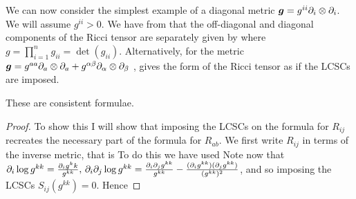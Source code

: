 \documentclass{article}
\begin{document}
We can now consider the simplest example of a diagonal metric $\bm{g} = g^{ii} \partial_i \otimes \partial_i$. We will assume $g^{ii} > 0$. We have from \cite{Win1996} that the off-diagonal and diagonal components of the Ricci tensor are separately given by 
where $g = \prod_{i=1}^n g_{ii} = \det(g_{ii})$. Alternatively, for the metric $\bm{g} = g^{aa}\partial_a \otimes \partial_a + g^{\alpha\beta}\partial_\alpha \otimes \partial_\beta$ \cite{Benenti1980}, \cite{Benenti2002} gives the form of the Ricci tensor as 
if the LCSCs are imposed. 
\begin{lemma}
	These are consistent formulae. 
\end{lemma}
\begin{proof}
To show this I will show that imposing the LCSCs on the formula for $R_{ij}$ recreates the necessary part of the formula for $R_{ab}$. 
We first write $R_{ij}$ in terms of the inverse metric, that is 
To do this we have used 
Note now that $\partial_i \log g^{kk} = \frac{\partial_i g^kk}{g^{kk}}, \, \partial_i \partial_j \log g^{kk} = \frac{\partial_i \partial_j g^{kk} }{g^{kk}} - \frac{ (\partial_i g^{kk})(\partial_j g^{kk})}{(g^{kk})^2}$, and so 
imposing the LCSCs  $S_{ij}(g^{kk})=0$. Hence 
\end{proof}
 
\end{document}
